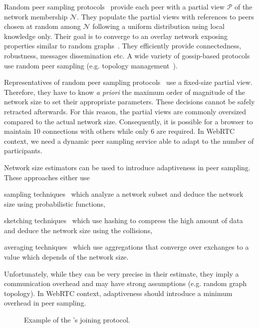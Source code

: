 Random peer sampling protocols~\cite{jelasity2004peer} provide each
peer with a partial view $\mathcal{P}$ of the network membership
$\mathcal{N}$. They populate the partial views with references to
peers chosen at random among $\mathcal{N}$ following a uniform
distribution using local knowledge only. Their goal is to converge to
an overlay network exposing properties similar to random
graphs~\cite{erdos1959random}. They efficiently provide connectedness,
robustness, messages dissemination etc. A wide variety of gossip-based
protocols use random peer sampling (e.g. topology
management~\cite{voulgaris2005epidemic, jelasity2009tman,
  dabek2004vivaldi}).

Representatives of random peer sampling
protocols~\cite{voulgaris2005cyclon, eugster2003lightweight,
  tolgyeski2009adaptive} use a fixed-size partial view. Therefore, they
have to know \emph{a priori} the maximum order of magnitude of the
network size to set their appropriate parameters. These decisions
cannot be safely retracted afterwards. For this reason, the partial
views are commonly oversized compared to the actual network
size. Consequently, it is possible for a browser to maintain 10
connections with others while only 6 are required. In WebRTC context,
we need a dynamic peer sampling service able to adapt to the number of
participants.

Network size estimators can be used to introduce adaptiveness in peer
sampling. These approaches either use
\begin{inparaenum}[(i)]
\item sampling techniques~\cite{mane05network, ganesh2007peer,
    kostoulas2007active} which analyze a network subset and deduce the network
  size using probabilistic functions,
\item sketching techniques~\cite{flajolet2008hyperloglog, baquero2012extrema}
  which use hashing to compress the high amount of data and deduce the network
  size using the collisions,
\item averaging techniques~\cite{jelasity2004epidemic, blasa2011symmetric}
  which use aggregations that converge over exchanges to a value which depends
  of the network size.
\end{inparaenum}
Unfortunately, while they can be very precise in their estimate, they
imply a communication overhead and may have strong assumptions
(e.g. random graph topology). In WebRTC context, adaptiveness should
introduce a minimum overhead in peer sampling.

\begin{figure*}
  \centering
  \hspace{40pt}
  \hspace{40pt}
  \caption{\label{fig:joiningexample}Example of the \SPRAY's joining
    protocol.}
\end{figure*}


